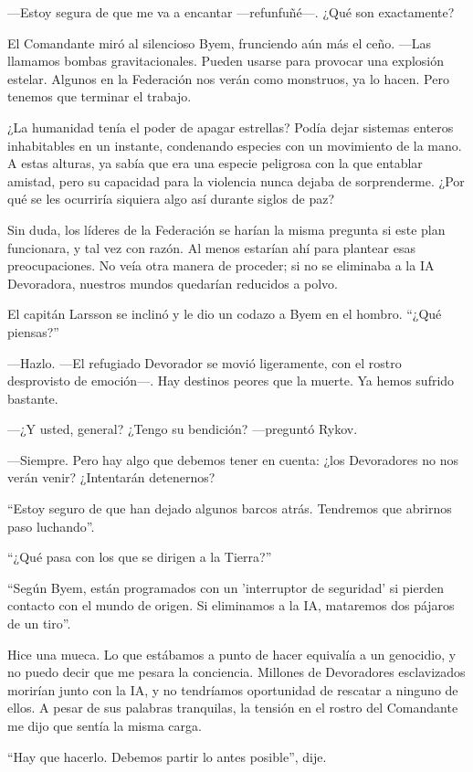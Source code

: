 —Estoy segura de que me va a encantar —refunfuñé—. ¿Qué son exactamente?

El Comandante miró al silencioso Byem, frunciendo aún más el ceño. —Las llamamos bombas gravitacionales. Pueden usarse para provocar una explosión estelar. Algunos en la Federación nos verán como monstruos, ya lo hacen. Pero tenemos que terminar el trabajo.

¿La humanidad tenía el poder de apagar estrellas? Podía dejar sistemas enteros inhabitables en un instante, condenando especies con un movimiento de la mano. A estas alturas, ya sabía que era una especie peligrosa con la que entablar amistad, pero su capacidad para la violencia nunca dejaba de sorprenderme. ¿Por qué se les ocurriría siquiera algo así durante siglos de paz?

Sin duda, los líderes de la Federación se harían la misma pregunta si este plan funcionara, y tal vez con razón. Al menos estarían ahí para plantear esas preocupaciones. No veía otra manera de proceder; si no se eliminaba a la IA Devoradora, nuestros mundos quedarían reducidos a polvo.

El capitán Larsson se inclinó y le dio un codazo a Byem en el hombro. ``¿Qué piensas?''

—Hazlo. —El refugiado Devorador se movió ligeramente, con el rostro desprovisto de emoción—. Hay destinos peores que la muerte. Ya hemos sufrido bastante.

—¿Y usted, general? ¿Tengo su bendición? —preguntó Rykov.

—Siempre. Pero hay algo que debemos tener en cuenta: ¿los Devoradores no nos verán venir? ¿Intentarán detenernos?

``Estoy seguro de que han dejado algunos barcos atrás. Tendremos que abrirnos paso luchando''.

``¿Qué pasa con los que se dirigen a la Tierra?''

``Según Byem, están programados con un 'interruptor de seguridad' si pierden contacto con el mundo de origen. Si eliminamos a la IA, mataremos dos pájaros de un tiro''.

Hice una mueca. Lo que estábamos a punto de hacer equivalía a un genocidio, y no puedo decir que me pesara la conciencia. Millones de Devoradores esclavizados morirían junto con la IA, y no tendríamos oportunidad de rescatar a ninguno de ellos. A pesar de sus palabras tranquilas, la tensión en el rostro del Comandante me dijo que sentía la misma carga.

``Hay que hacerlo. Debemos partir lo antes posible'', dije.

